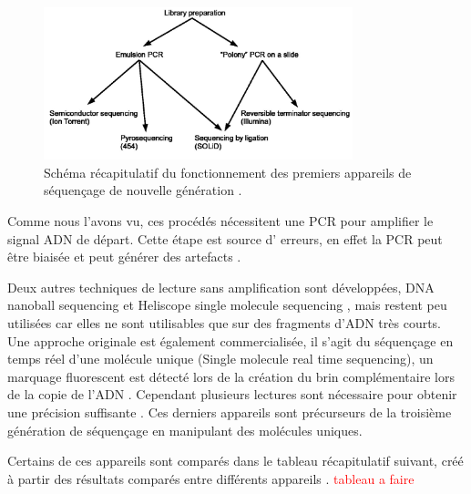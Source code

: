 \documentclass[a4paper,11pt]{article}
\begin{document}
\begin{figure}[H]
\begin{center}
\includegraphics[width=0.8\textwidth]{ngsprinciple.jpg}
\vspace{0.5cm}

\caption{Schéma récapitulatif du fonctionnement des premiers appareils de séquençage de nouvelle génération \cite{ngsprinciplejpg}.}
\label{ngsprinciple}
\end{center}
\end{figure}

Comme nous l'avons vu, ces procédés nécessitent une PCR pour amplifier le signal ADN de départ. Cette étape est source d' erreurs, en effet la PCR peut être biaisée et peut générer des artefacts \cite{Acinas2005}.



Deux autres techniques de lecture sans amplification sont développées, DNA nanoball sequencing \cite{Porreca2010} et Heliscope single molecule sequencing \cite{pmid20890904}, mais restent peu utilisées car elles ne sont utilisables que sur des fragments d'ADN très courts. Une approche originale est également commercialisée, il s'agit du séquençage en temps réel d'une molécule unique (Single molecule real time sequencing), un marquage fluorescent est détecté lors de la création du brin complémentaire lors de la copie de l'ADN \cite{Eid2009}. Cependant plusieurs lectures sont nécessaire pour obtenir une précision suffisante \cite{Chin2013}. Ces derniers appareils sont précurseurs de la troisième génération de séquençage en manipulant des molécules uniques.



Certains de ces appareils sont comparés dans le tableau récapitulatif suivant, créé à partir des résultats comparés entre différents appareils \cite{Quail2012,Liu2012}. \textcolor{red}{tableau a faire}
\end{document}
